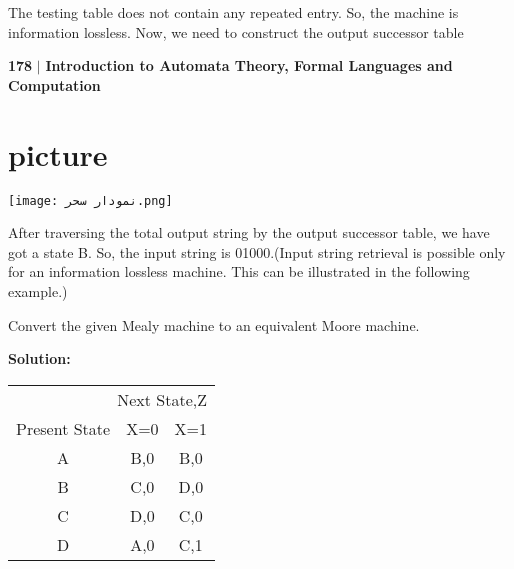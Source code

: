 \documentclass[a4]{article}
\begin{document}
The testing table does not contain any repeated entry. So, the machine is information lossless. Now, we need to construct the output successor table


\newpage
 \begin{flushleft}
    \textbf{178}\hspace*{0.1cm} \textbf{$|$} \hspace*{0.1cm} {\tiny \textbf{Introduction to Automata Theory, Formal Languages and Computation}}
  \end{flushleft}

\vspace*{0.1cm}

\section{picture}
\texttt{[image: نمودار سحر.png]}



After traversing the total output string by the output successor table, we have got a state B. So, the input string is 01000.(Input string retrieval is possible only for an information lossless machine. This can be illustrated in the following example.)


\vspace*{0.3cm}
 \hspace*{0.2cm} \footnotesize{Convert the given Mealy machine to an equivalent Moore machine.}

\vspace*{0.3cm}

\large{\textbf{Solution:}}
\vspace*{0.2cm}


\begin{center}
\begin{tabular}{ccc}
\hline

\hline

\hline

\hline
  \multicolumn{3}{r}{{Next State,Z}}\\
 \cline{2-3}
{Present State} & {X=0} & {X=1}\\
\hline
 A & B,0 & B,0 \\
 B & C,0 & D,0\\
 C & D,0 & C,0\\
 D & A,0 & C,1\\
\hline

\hline

\hline

\hline
\end{tabular}
\end{center}
\end{document}
